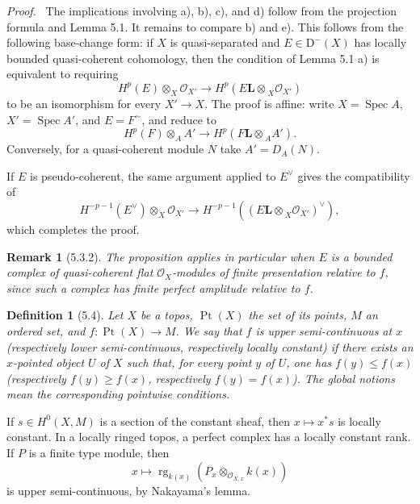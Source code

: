 \documentclass[13pt]{extarticle}
\newcommand{\cO}{\mathcal O}
\newcommand{\D}{\mathrm D}
\newcommand{\Spec}{\operatorname{Spec}}
\newcommand{\Pt}{\operatorname{Pt}}
\newcommand{\rg}{\operatorname{rg}}
\newcommand{\Ltens}{\mathbin{\mathbf L\!\otimes}}
\newenvironment{prooftext}[1][Proof]{\par\noindent\emph{#1.}\ }{\par\medskip}
\newtheorem*{definition*}{Definition}
\newtheorem*{remark*}{Remark}
\begin{document}
\begin{prooftext}
The implications involving a), b), c), and d) follow from the projection formula and Lemma 5.1. It remains to compare b) and e). This follows from the following base-change form: if $X$ is quasi-separated and $E\in\D^-(X)$ has locally bounded quasi-coherent cohomology, then the condition of Lemma 5.1 a) is equivalent to requiring
\[
H^p(E)\otimes_X\cO_{X'}\to H^p(E\Ltens_X\cO_{X'})
\]
to be an isomorphism for every $X'\to X$. The proof is affine: write $X=\Spec A$, $X'=\Spec A'$, and $E=F^{\sim}$, and reduce to
\[
H^p(F)\otimes_A A'\to H^p(F\Ltens_A A').
\]
Conversely, for a quasi-coherent module $N$ take $A'=D_A(N)$.

If $E$ is pseudo-coherent, the same argument applied to $E^\vee$ gives the compatibility of
\[
H^{-p-1}(E^\vee)\otimes_X\cO_{X'}
\longrightarrow
H^{-p-1}((E\Ltens_X\cO_{X'})^\vee),
\]
which completes the proof.
\end{prooftext}

\begin{remark*}[5.3.2]
The proposition applies in particular when $E$ is a bounded complex of quasi-coherent flat $\cO_X$-modules of finite presentation relative to $f$, since such a complex has finite perfect amplitude relative to $f$.
\end{remark*}

\begin{definition*}[5.4]
Let $X$ be a topos, $\Pt(X)$ the set of its points, $M$ an ordered set, and $f:\Pt(X)\to M$. We say that $f$ is upper semi-continuous at $x$ (respectively lower semi-continuous, respectively locally constant) if there exists an $x$-pointed object $U$ of $X$ such that, for every point $y$ of $U$, one has $f(y)\le f(x)$ (respectively $f(y)\ge f(x)$, respectively $f(y)=f(x)$). The global notions mean the corresponding pointwise conditions.
\end{definition*}

If $s\in H^0(X,M)$ is a section of the constant sheaf, then $x\mapsto x^*s$ is locally constant. In a locally ringed topos, a perfect complex has a locally constant rank. If $P$ is a finite type module, then
\[
x\longmapsto \rg_{k(x)}(P_x\otimes_{\cO_{X,x}}k(x))
\]
is upper semi-continuous, by Nakayama's lemma.
\end{document}
